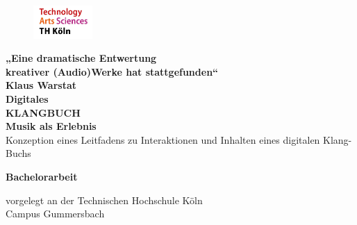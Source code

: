 
\begin{titlepage}

\begin{center}

\begin{figure}[!ht]
		\includegraphics[width=0.2\textwidth]{grafiken/logoheader.jpg}
\end{figure}

\vspace{1.3cm}

\begin{rmfamily}
\textbf{\small „Eine dramatische Entwertung\\kreativer (Audio)Werke hat stattgefunden“ \cite{K01}\\
				Klaus Warstat}\\
\vspace{1.7cm}
\textbf{\huge Digitales}\\
\vspace{0.3cm}
\textbf{\huge \textcolor{m_pink}{\textbf{KLANG}}BUCH}\\
\vspace{0.2cm}
\textbf{\small Musik als Erlebnis}\\
\vspace{0.8cm}
\LARGE Konzeption eines Leitfadens zu Interaktionen und Inhalten eines digitalen Klang-Buchs
\normalsize
\end{rmfamily}


\vspace{1cm}

\begin{LARGE}
\begin{scshape}
\textbf{\huge Bachelorarbeit}\\[0.5em]
\end{scshape}
\end{LARGE}

\vspace{0.7cm}

\begin{large}
vorgelegt an der Technischen Hochschule Köln\\ 
\vspace{0.2cm}
Campus Gummersbach
\end{large}


\end{center}
\end{titlepage}
